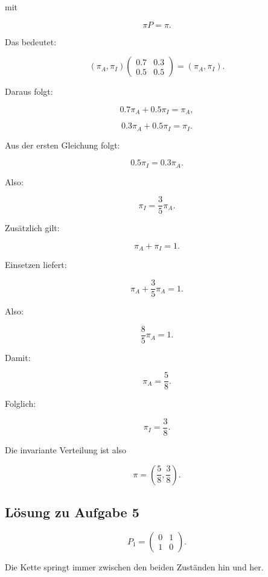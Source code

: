 \documentclass[11pt,a4paper]{article}
\begin{document}
mit

\[
\pi P = \pi.
\]

Das bedeutet:

\[
(\pi_A,\pi_I)
\begin{pmatrix}
0.7 & 0.3 \\
0.5 & 0.5
\end{pmatrix}
=
(\pi_A,\pi_I).
\]

Daraus folgt:

\[
0.7\pi_A+0.5\pi_I=\pi_A,
\]

\[
0.3\pi_A+0.5\pi_I=\pi_I.
\]

Aus der ersten Gleichung folgt:

\[
0.5\pi_I=0.3\pi_A.
\]

Also:

\[
\pi_I=\frac{3}{5}\pi_A.
\]

Zusätzlich gilt:

\[
\pi_A+\pi_I=1.
\]

Einsetzen liefert:

\[
\pi_A+\frac35\pi_A=1.
\]

Also:

\[
\frac85\pi_A=1.
\]

Damit:

\[
\pi_A=\frac58.
\]

Folglich:

\[
\pi_I=\frac38.
\]

Die invariante Verteilung ist also

\[
\boxed{
\pi=
\left(
\frac58,\frac38
\right)
}.
\]

\subsection*{Lösung zu Aufgabe 5}

\[
P_1 =
\begin{pmatrix}
0 & 1 \\
1 & 0
\end{pmatrix}.
\]

Die Kette springt immer zwischen den beiden Zuständen hin und her.
\end{document}
